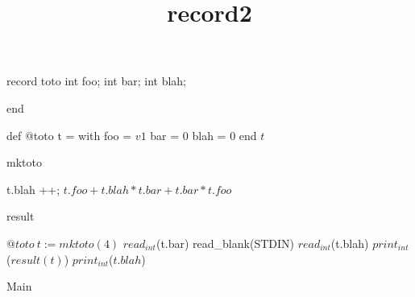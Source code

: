 \documentclass[8pt]{article}
\title{record2}
\begin{document}
\maketitle
record toto int foo;
int bar;
int blah;

end

\begin{algorithm}[H]
def @toto t = with foo = $ v1 $
bar = $ 0 $
blah = $ 0 $ end
\Return $ t $\;
\caption{mktoto}
\end{algorithm}
\begin{algorithm}[H]

t.blah ++;
\Return $ t.foo + t.blah * t.bar + t.bar * t.foo $\;
\caption{result}
\end{algorithm}

\begin{algorithm}[H]
$@toto\:t := mktoto(4)$\;
$read_{int}$(t.bar)\;
read\_blank(STDIN)\;
$read_{int}$(t.blah)\;
$print_{int}$($ result(t) $)\;
$print_{int}$($ t.blah $)\;
\caption{Main}
\end{algorithm}
\end{document}
